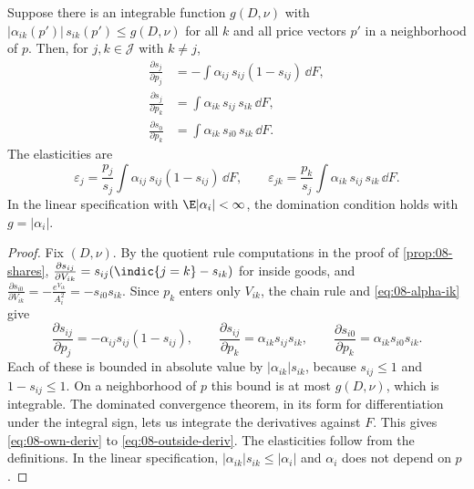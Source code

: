\begin{proposition}\label{prop:08-derivs}
Suppose there is an integrable function $g(D, \nu)$ with $|\alpha_{ik}(p')|\, s_{ik}(p') \le g(D, \nu)$ for all
$k$ and all price vectors $p'$ in a neighborhood of $p$. Then, for $j, k \in \mathcal{J}$ with $k \ne j$,
\begin{align}
  \frac{\partial s_j}{\partial p_j} &= -\int \alpha_{ij}\, s_{ij}(1 - s_{ij})\, \dd F, \label{eq:08-own-deriv}\\
  \frac{\partial s_j}{\partial p_k} &= \int \alpha_{ik}\, s_{ij}\, s_{ik}\, \dd F, \label{eq:08-cross-deriv}\\
  \frac{\partial s_0}{\partial p_k} &= \int \alpha_{ik}\, s_{i0}\, s_{ik}\, \dd F. \label{eq:08-outside-deriv}
\end{align}
The elasticities are
\begin{equation}\label{eq:08-rc-elasticities}
  \varepsilon_j = \frac{p_j}{s_j}\int \alpha_{ij}\, s_{ij}(1 - s_{ij})\, \dd F, \qquad
  \varepsilon_{jk} = \frac{p_k}{s_j}\int \alpha_{ik}\, s_{ij}\, s_{ik}\, \dd F.
\end{equation}
In the linear specification with $\E|\alpha_i| < \infty$, the domination condition holds with $g = |\alpha_i|$.
\end{proposition}

\begin{proof}
Fix $(D, \nu)$. By the quotient rule computations in the proof of \cref{prop:08-shares},
$\frac{\partial s_{ij}}{\partial V_{ik}} = s_{ij}(\indic\{j = k\} - s_{ik})$ for inside goods, and
$\frac{\partial s_{i0}}{\partial V_{ik}} = -\frac{e^{V_{ik}}}{A_i^2} = -s_{i0}s_{ik}$. Since $p_k$ enters only
$V_{ik}$, the chain rule and \eqref{eq:08-alpha-ik} give
\begin{equation*}
  \frac{\partial s_{ij}}{\partial p_j} = -\alpha_{ij}s_{ij}(1 - s_{ij}), \qquad
  \frac{\partial s_{ij}}{\partial p_k} = \alpha_{ik}s_{ij}s_{ik}, \qquad
  \frac{\partial s_{i0}}{\partial p_k} = \alpha_{ik}s_{i0}s_{ik}.
\end{equation*}
Each of these is bounded in absolute value by $|\alpha_{ik}|s_{ik}$, because $s_{ij} \le 1$ and $1 - s_{ij} \le
1$. On a neighborhood of $p$ this bound is at most $g(D, \nu)$, which is integrable. The dominated convergence
theorem, in its form for differentiation under the integral sign, lets us integrate the derivatives against $F$.
This gives \eqref{eq:08-own-deriv} to \eqref{eq:08-outside-deriv}. The elasticities follow from the definitions.
In the linear specification, $|\alpha_{ik}|s_{ik} \le |\alpha_i|$ and $\alpha_i$ does not depend on $p$.
\end{proof}


